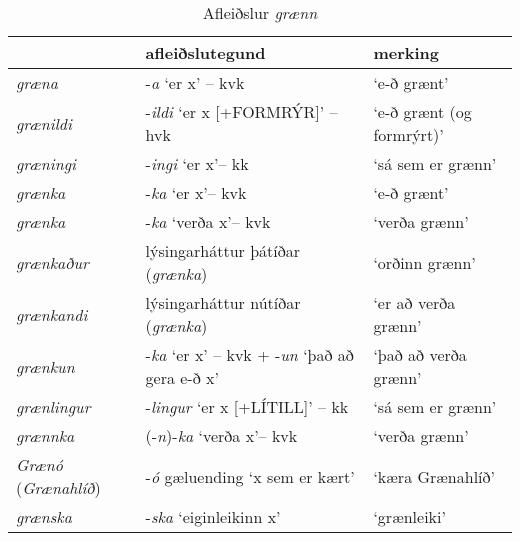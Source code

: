 \documentclass[../samsetningasafn.tex]{subfiles}
\begin{document}
\begin{table}[ht!]%
\begin{footnotesize}
\begin{tcolorbox}
	\begin{center}
	\begin{tabularx}{\textwidth}{Xll}
						&	\textbf{afleiðslutegund}					&	\textbf{merking}	\\
	\hline
	\textit{græna}		&	-\textit{a} \lq er x\rq{} -- kvk				&	\lq e-ð grænt\rq	\\
	\textit{grænildi}		&	-\textit{ildi} \lq er x [+FORMRÝR]\rq{} -- hvk	&	\lq e-ð grænt (og formrýrt)\rq		\\
	\textit{græningi}		&	-\textit{ingi} \lq er x\rq -- kk				&	\lq sá sem er grænn\rq	\\
	\textit{grænka}		&	-\textit{ka} \lq er x\rq -- kvk 				&	\lq e-ð grænt\rq	\\
	\textit{grænka}		&	-\textit{ka} \lq verða x\rq -- kvk 			&	\lq verða grænn\rq	\\
	\textit{grænkaður}	&	lýsingarháttur þátíðar (\textit{grænka})	&	\lq orðinn grænn\rq	\\
	\textit{grænkandi}	&	lýsingarháttur nútíðar (\textit{grænka})	&	\lq er að verða grænn\rq	\\
	\textit{grænkun}		&	-\textit{ka} \lq er x\rq{} -- kvk + -\textit{un} \lq það að gera e-ð x\rq	&	\lq það að verða grænn\rq	\\
	\textit{grænlingur}	&	-\textit{lingur} \lq er x [+LÍTILL]\rq{} -- kk	&	\lq sá sem er grænn\rq	\\
	\textit{grænnka}		&	(-\textit{n})-\textit{ka} \lq verða x\rq -- kvk 	&	\lq verða grænn\rq	\\
	\textit{Grænó} (\textit{Grænahlíð})	&	-\textit{ó} gæluending \lq x sem er kært\rq	&	\lq kæra Grænahlíð\rq \\
	\textit{grænska}		&	-\textit{ska} \lq eiginleikinn x\rq			&	\lq grænleiki\rq	\\
	\end{tabularx}
	\end{center}
\end{tcolorbox}
\end{footnotesize}
	\caption{Afleiðslur \textit{grænn}}
	\label{tafla:grafl}
\end{table}

\clearpage
\end{document}
